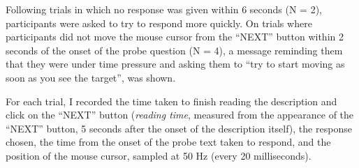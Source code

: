 Following trials in which no response was given within 6 seconds (N = 2),
participants were asked to try to respond more quickly.
On trials where participants did not move the mouse cursor
from the ``NEXT'' button within 2 seconds of the onset of the probe question (N = 4),
a message reminding them that they were under time pressure
and asking them to ``try to start moving as soon as you see the target'',
was shown.

For each trial, I recorded the time taken to
finish reading the description and click on the ``NEXT'' button
(\emph{reading time}, measured from the appearance 
of the ``NEXT'' button, 5 seconds after the onset of the description itself),
the response chosen, the time from the onset of the probe text taken to respond,
and the position of the mouse cursor, sampled at 50 Hz (every 20 milliseconds).

